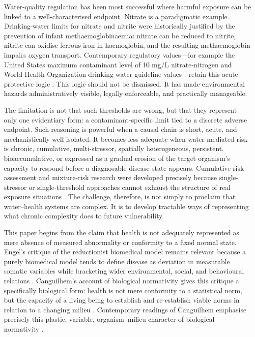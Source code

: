 Water-quality regulation has been most successful where harmful exposure can be linked to a well-characterised endpoint. Nitrate is a paradigmatic example. Drinking-water limits for nitrate and nitrite were historically justified by the prevention of infant methaemoglobinaemia: nitrate can be reduced to nitrite, nitrite can oxidise ferrous iron in haemoglobin, and the resulting methaemoglobin impairs oxygen transport. Contemporary regulatory values---for example the United States maximum contaminant level of 10 mg/L nitrate-nitrogen and World Health Organization drinking-water guideline values---retain this acute protective logic \citep{epa2026npdwr,who2022gdwq}. This logic should not be dismissed. It has made environmental hazards administratively visible, legally enforceable, and practically manageable.

The limitation is not that such thresholds are wrong, but that they represent only one evidentiary form: a contaminant-specific limit tied to a discrete adverse endpoint. Such reasoning is powerful when a causal chain is short, acute, and mechanistically well isolated. It becomes less adequate when water-mediated risk is chronic, cumulative, multi-stressor, spatially heterogeneous, persistent, bioaccumulative, or expressed as a gradual erosion of the target organism's capacity to respond before a diagnosable disease state appears. Cumulative risk assessment and mixture-risk research were developed precisely because single-stressor or single-threshold approaches cannot exhaust the structure of real exposure situations \citep{epa2003cumulative,sexton2012cumulative,bopp2019mixtures}. The challenge, therefore, is not simply to proclaim that water--health systems are complex. It is to develop tractable ways of representing what chronic complexity does to future vulnerability.

This paper begins from the claim that health is not adequately represented as mere absence of measured abnormality or conformity to a fixed normal state. Engel's critique of the reductionist biomedical model remains relevant because a purely biomedical model tends to define disease as deviation in measurable somatic variables while bracketing wider environmental, social, and behavioural relations \citep{engel1977newmodel}. Canguilhem's account of biological normativity gives this critique a specifically biological form: health is not mere conformity to a statistical norm, but the capacity of a living being to establish and re-establish viable norms in relation to a changing milieu \citep{canguilhem1991normal,canguilhem2008knowledge}. Contemporary readings of Canguilhem emphasise precisely this plastic, variable, organism--milieu character of biological normativity \citep{sholl2020plastic}.

